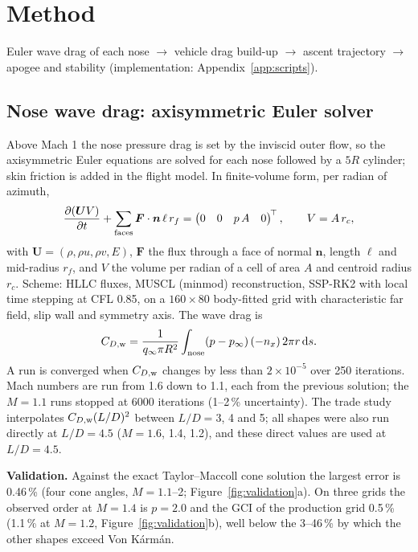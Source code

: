 \section{Method}
\label{sec:method}

Euler wave drag of each nose $\rightarrow$ vehicle drag build-up $\rightarrow$ ascent trajectory
$\rightarrow$ apogee and stability (implementation: Appendix~\ref{app:scripts}).

\subsection{Nose wave drag: axisymmetric Euler solver}
\label{sec:euler}

Above Mach 1 the nose pressure drag is set by the inviscid outer flow, so the axisymmetric Euler
equations are solved for each nose followed by a $5R$ cylinder; skin friction is added in the flight
model. In finite-volume form, per radian of azimuth,
\begin{equation}
\frac{\partial (\boldsymbol U V)}{\partial t} + \sum_{\rm faces} \boldsymbol F\cdot\boldsymbol n\, \ell\, r_f
= \begin{pmatrix} 0 & 0 & p\,A & 0 \end{pmatrix}^{\!\top},
\qquad V = A\, r_c ,
\label{eq:euler}
\end{equation}
with $\boldsymbol U = (\rho,\rho u,\rho v,E)$, $\boldsymbol F$ the flux through a face of normal
$\boldsymbol n$, length $\ell$ and mid-radius $r_f$, and $V$ the volume per radian of a cell of area $A$
and centroid radius $r_c$. Scheme: HLLC fluxes, MUSCL (minmod) reconstruction, SSP-RK2 with local time
stepping at CFL 0.85, on a $160\times80$ body-fitted grid with characteristic far field, slip wall and
symmetry axis. The wave drag is
\begin{equation}
C_{D,\rm w} = \frac{1}{q_\infty \pi R^2}\int_{\rm nose} (p-p_\infty)\,(-n_x)\, 2\pi r\,\mathrm ds .
\label{eq:cdw}
\end{equation}
A run is converged when $C_{D,\rm w}$ changes by less than $2\times10^{-5}$ over 250 iterations. Mach
numbers are run from 1.6 down to 1.1, each from the previous solution; the $M=1.1$ runs stopped at 6000
iterations (1--2\,\% uncertainty). The trade study interpolates $C_{D,\rm w}(L/D)^2$ between $L/D = 3$, 4
and 5; all shapes were also run directly at $L/D = 4.5$ ($M = 1.6$, 1.4, 1.2), and these direct values
are used at $L/D = 4.5$.

\textbf{Validation.} Against the exact Taylor--Maccoll cone solution the largest error is 0.46\,\%
(four cone angles, $M = 1.1$--2; Figure~\ref{fig:validation}a). On three grids the observed order at
$M=1.4$ is $p = 2.0$ and the GCI of the production grid 0.5\,\% (1.1\,\% at $M = 1.2$,
Figure~\ref{fig:validation}b), well below the 3--46\,\% by which the other shapes exceed Von K\'arm\'an.

